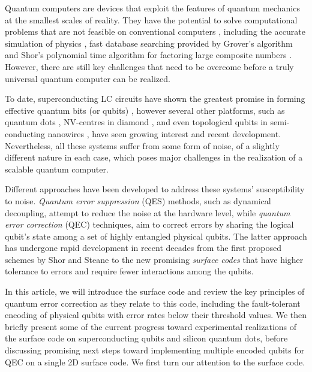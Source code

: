 Quantum computers are devices that exploit the features of quantum mechanics at
the smallest scales of reality. They have the potential to solve computational
problems that are not feasible on conventional computers
\cite{nielsen_chuang_2010}, including the accurate simulation of physics
\cite{feynman82_simul_physic_with_comput}, fast database searching provided by
Grover's algorithm \cite{Grover_1996} and Shor's polynomial time algorithm for
factoring large composite numbers \cite{Shor_1997}. However, there are still key
challenges that need to be overcome before a truly universal quantum computer
can be realized.


To date, superconducting LC circuits have shown the greatest promise in forming
effective quantum bits (or qubits) \cite{Rol_2019}
\cite{barends14_super_quant_circuit_at_surfac}, however several other platforms,
such as quantum dots \cite{huang19_fidel_bench_two_qubit_gates_silic}
\cite{Lawrie_2020}, NV-centres in diamond \cite{Taminiau_2014}, and even
topological qubits in semi-conducting nanowires \cite{Mourik_2012}, have seen
growing interest and recent development. Nevertheless, all these systems suffer
from some form of noise, of a slightly different nature in each case, which
poses major challenges in the realization of a scalable quantum computer.

Different approaches have been developed to address these systems'
susceptibility to noise. \textit{Quantum error suppression} (QES) methods, such
as dynamical decoupling, attempt to reduce the noise at the hardware level,
while \textit{quantum error correction} (QEC) techniques, aim to correct errors
by sharing the logical qubit's state among a set of highly entangled
physical qubits. The latter approach has undergone rapid development in recent
decades from the first proposed schemes by Shor \cite{Shor_1995_QEC} and Steane
\cite{Steane_1996_QEC} to the new promising \textit{surface codes}
\cite{fowler12_surfac_codes} that have higher tolerance to errors and require
fewer interactions among the qubits.

In this article, we will introduce the surface code and review the key
principles of quantum error correction as they relate to this code, including
the fault-tolerant encoding of physical qubits with error rates below their
threshold values. We then briefly present some of the current progress toward
experimental realizations of the surface code on superconducting qubits and
silicon quantum dots, before discussing promising next steps toward implementing
multiple encoded qubits for QEC on a single 2D surface code. We first turn our
attention to the surface code.

